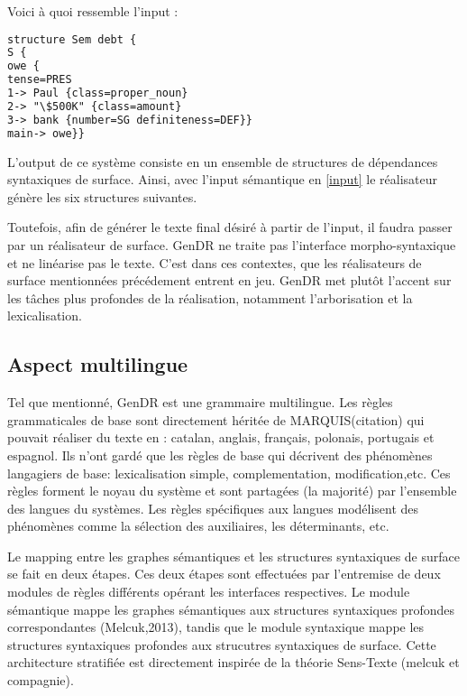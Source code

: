 Voici à quoi ressemble l'input :
\begin{lstlisting}[language=XML, caption = Input sémantique, label=input]
structure Sem debt {
S {
owe {
tense=PRES
1-> Paul {class=proper_noun}
2-> "\$500K" {class=amount}
3-> bank {number=SG definiteness=DEF}}
main-> owe}}
\end{lstlisting}


L'output de ce système consiste en un ensemble de structures de dépendances syntaxiques de surface. Ainsi, avec l'input sémantique en \ref{input} le réalisateur génère les six structures suivantes. 


Toutefois, afin de générer le texte final désiré à partir de l'input, il faudra passer par un réalisateur de surface. GenDR ne traite pas l'interface morpho-syntaxique et ne linéarise pas le texte. C'est dans ces contextes, que les réalisateurs de surface mentionnées précédement entrent en jeu. GenDR met plutôt l'accent sur les tâches plus profondes de la réalisation, notamment l'arborisation et la lexicalisation.

\subsection{Aspect multilingue}
Tel que mentionné, GenDR est une grammaire multilingue. Les règles grammaticales de base sont directement héritée de MARQUIS(citation) qui pouvait réaliser du texte en : catalan, anglais, français, polonais, portugais et espagnol. Ils n'ont gardé que les règles de base qui décrivent des phénomènes langagiers de base: lexicalisation simple, complementation, modification,etc. Ces règles forment le noyau du système et sont partagées (la majorité) par l'ensemble des langues du systèmes. Les règles spécifiques aux langues modélisent des phénomènes comme la sélection des auxiliaires, les déterminants, etc.

Le mapping entre les graphes sémantiques et les structures syntaxiques de surface se fait en deux étapes. Ces deux étapes sont effectuées par l'entremise de deux modules de règles différents opérant les interfaces respectives. Le module sémantique mappe les graphes sémantiques aux structures syntaxiques profondes correspondantes (Melcuk,2013), tandis que le module syntaxique mappe les structures syntaxiques profondes aux strucutres syntaxiques de surface. Cette architecture stratifiée est directement inspirée de la théorie Sens-Texte (melcuk et compagnie).

